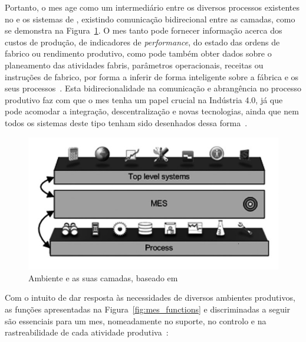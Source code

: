 Portanto, o \gls{mes} age como um intermediário entre os diversos processos existentes no  e os sistemas de , existindo comunicação bidirecional entre as camadas, como se demonstra na Figura~\ref{fig:mes_layers}. O \gls{mes} tanto pode fornecer informação acerca dos custos de produção, de indicadores de \textit{performance}, do estado das ordens de fabrico ou rendimento produtivo, como pode também obter dados sobre o planeamento das atividades fabris, parâmetros operacionais, receitas ou instruções de fabrico, por forma a inferir de forma inteligente sobre a fábrica e os seus processos~\parencite{mes_explained_high_level_vision}. Esta bidirecionalidade na comunicação e abrangência no processo produtivo faz com que o \gls{mes} tenha um papel crucial na Indústria 4.0, já que pode acomodar a integração, descentralização e novas tecnologias, ainda que nem todos os sistemas deste tipo tenham sido desenhados dessa forma~\parencite{cmf_mes_definition}.
%
\begin{figure}
    \centering
    \includegraphics[width=.8\textwidth]{ch02/assets/mes_layers.jpg}
    \caption{Ambiente  e as suas camadas, baseado em~\textcite[p.~526]{mes_literature_review}}
    \label{fig:mes_layers}
\end{figure}

Com o intuito de dar resposta às necessidades de diversos ambientes produtivos, as funções apresentadas na Figura~\ref{fig:mes_functions} e discriminadas a seguir são essenciais para um \gls{mes}, nomeadamente no suporte, no controlo e na rastreabilidade de cada atividade produtiva~\parencite{mes_literature_review, mes_explained_high_level_vision, introduction_mes}:

